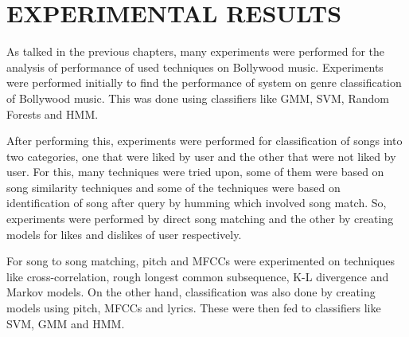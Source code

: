 \chapter{EXPERIMENTAL RESULTS}
\label{chap:exp}
As talked in the previous chapters, many experiments were performed for the analysis of performance of used techniques on Bollywood music. Experiments were performed initially to find the performance of system on genre classification of Bollywood music. This was done using classifiers like GMM, SVM, Random Forests and HMM. 
\par After performing this, experiments were performed for classification of songs into two categories, one that were liked by user and the other that were not liked by user. For this, many techniques were tried upon, some of them were based on song similarity techniques and some of the techniques were based on identification of song after query by humming which involved song match. So, experiments were performed by direct song matching and the other by creating models for likes and dislikes of user respectively.
\par For song to song matching, pitch and MFCCs were experimented on techniques like cross-correlation, rough longest common subsequence, K-L divergence and Markov models. On the other hand, classification was also done by creating models using pitch, MFCCs and lyrics. These were then fed to classifiers like SVM, GMM and HMM. 

